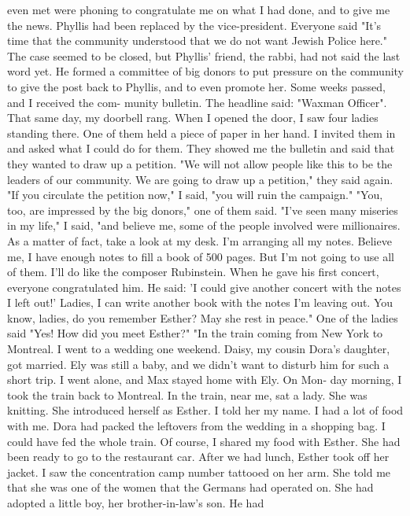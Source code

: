 even met were phoning to congratulate me on what I had done, and to 
give me the news. Phyllis had been replaced by the vice-president. 
Everyone said "It's time that the community understood that we do 
not want Jewish Police here." 
The case seemed to be closed, but Phyllis' friend, the rabbi, 
had not said the last word yet. He formed a committee of big donors 
to put pressure on the community to give the post back to Phyllis, 
and to even promote her. Some weeks passed, and I received the com-
munity bulletin. The headline said: "Waxman Officer". 
That same day, my doorbell rang. When I opened the door, I saw 
four ladies standing there. One of them held a piece of paper in her 
hand. I invited them in and asked what I could do for them. They 
showed me the bulletin and said that they wanted to draw up a petition. 
"We will not allow people like this to be the leaders of our 
community. We are going to draw up a petition," they said again. 
"If you circulate the petition now," I said, "you will ruin the 
campaign." 
"You, too, are impressed by the big donors," one of them said. 
"I've seen many miseries in my life," I said, "and believe me, 
some of the people involved were millionaires. As a matter of fact, 
take a look at my desk. I'm arranging all my notes. Believe me, I 
have enough notes to fill a book of 500 pages. But I'm not going to 
use all of them. I'll do like the composer Rubinstein. When he 
gave his first concert, everyone congratulated him. He said: 'I 
could give another concert with the notes I left out!' Ladies, I can 
write another book with the notes I'm leaving out. You know, ladies, 
do you remember Esther? May she rest in peace." 
One of the ladies said "Yes! How did you meet Esther?" 
"In the train coming from New York to Montreal. I went to a 
wedding one weekend. Daisy, my cousin Dora's daughter, got married. 
Ely was still a baby, and we didn't want to disturb him for such 
a short trip. I went alone, and Max stayed home with Ely. On Mon-
day morning, I took the train back to Montreal. In the train, near 
me, sat a lady. She was knitting. 
She introduced herself as Esther. I told her my name. I had 
a lot of food with me. Dora had packed the leftovers from the wedding in a shopping bag. I could have fed the whole train. Of 
course, I shared my food with Esther. She had been ready to 
go to the restaurant car. After we had lunch, Esther took off her 
jacket. I saw the concentration camp number tattooed on her arm. 
She told me that she was one of the women that the Germans had operated on.
She had adopted a little boy, her brother-in-law's son. He had
